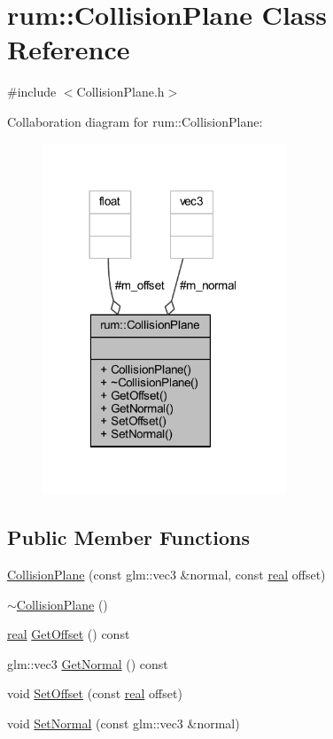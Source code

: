 \hypertarget{classrum_1_1_collision_plane}{}\section{rum\+:\+:Collision\+Plane Class Reference}
\label{classrum_1_1_collision_plane}


{\ttfamily \#include $<$Collision\+Plane.\+h$>$}



Collaboration diagram for rum\+:\+:Collision\+Plane\+:\nopagebreak
\begin{figure}[H]
\begin{center}
\leavevmode
\includegraphics[width=206pt]{classrum_1_1_collision_plane__coll__graph}
\end{center}
\end{figure}
\subsection*{Public Member Functions}
\begin{DoxyCompactItemize}
\item 
\hyperlink{classrum_1_1_collision_plane_a60ce36cfda9ed15842ce762737a62ce5}{Collision\+Plane} (const glm\+::vec3 \&normal, const \hyperlink{namespacerum_a7e8cca23573d5eaead0f138cbaa4862c}{real} offset)
\item 
\hyperlink{classrum_1_1_collision_plane_aed3fc45bbe236d0e3674745ed511ea14}{$\sim$\+Collision\+Plane} ()
\item 
\hyperlink{namespacerum_a7e8cca23573d5eaead0f138cbaa4862c}{real} \hyperlink{classrum_1_1_collision_plane_aec216956879a90c6ecaad6c26edf2f3b}{Get\+Offset} () const
\item 
glm\+::vec3 \hyperlink{classrum_1_1_collision_plane_a09d51ed117aeece88ca905b5d7f5d9ec}{Get\+Normal} () const
\item 
void \hyperlink{classrum_1_1_collision_plane_a875e1d5f35d8dd71dcbcb8a0d8dc9b8e}{Set\+Offset} (const \hyperlink{namespacerum_a7e8cca23573d5eaead0f138cbaa4862c}{real} offset)
\item 
void \hyperlink{classrum_1_1_collision_plane_aa515b99e33a423004fe1c675f4408913}{Set\+Normal} (const glm\+::vec3 \&normal)
\end{DoxyCompactItemize}
